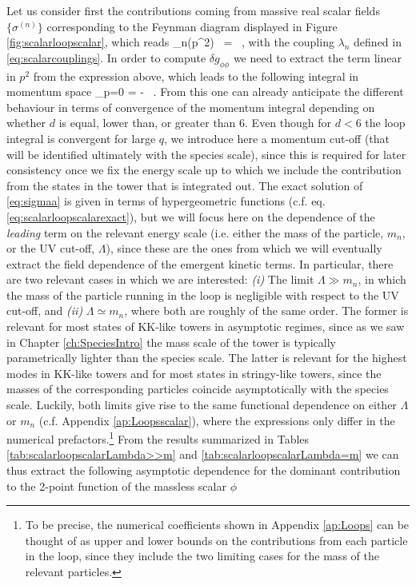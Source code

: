 Let us consider first the contributions coming from massive real scalar fields $\{\sigma^{(n)}\}$ corresponding to the Feynman diagram displayed in Figure \ref{fig:scalarloopscalar}, which reads
%
\beq
	\Pi_n(p^2) \ =  \int {}  \, ,
	\label{eq:selfenergyscalar}
\eeq
%
with the coupling $\lambda_n$ defined in \eqref{eq:scalarcouplings}. In order to compute $\delta g_{\phi \phi}$ we need to extract the term linear in $p^2$ from the expression above, which leads to the following integral in momentum space
%
\beq
	 \bigg\rvert_{p=0}  = -  \int {} \, .
	\label{eq:sigmaa}
\eeq
%
From this one can already anticipate the different behaviour in terms of convergence of the momentum integral depending on whether $d$ is equal, lower than, or greater than 6. Even though for $d<6$ the loop integral is convergent for large $q$, we introduce here a momentum cut-off (that will be identified ultimately with the species scale), since this is required for later consistency once we fix the energy scale up to which we include the contribution from the states in the tower that is integrated out. The exact solution of \eqref{eq:sigmaa} is given in terms of hypergeometric functions (c.f. eq. \eqref{eq:scalarloopscalarexact}), but we will focus here on the dependence of the \emph{leading} term on the relevant energy scale (i.e. either the mass of the particle, $m_n$, or the UV cut-off, $\Lambda$), since these are the ones from which we will eventually extract the field dependence of the emergent kinetic terms. In particular, there are two relevant cases in which we are interested: \emph{(i)} The limit $\Lambda \gg m_n$, in which the mass of the particle running in the loop is negligible with respect to the UV cut-off, and \emph{(ii)} $\Lambda\simeq m_n$, where both are roughly of the same order. The former is relevant for most states of KK-like towers in asymptotic regimes, since as we saw in Chapter \ref{ch:SpeciesIntro} the mass scale of the tower is typically parametrically lighter than the species scale. The latter is relevant for the highest modes in KK-like towers and for most states in stringy-like towers, since the masses of the corresponding particles coincide asymptotically with the species scale. Luckily, both limits give rise to the same functional dependence on either $\Lambda$ or $m_n$ (c.f. Appendix \ref{ap:Loopsscalar}), where the expressions only differ in the numerical prefactors.\footnote{To be precise, the numerical coefficients shown in Appendix \ref{ap:Loops} can be thought of as upper and lower bounds on the contributions from each particle in the loop, since they include the two limiting cases for the mass of the relevant particles.} From the results summarized in Tables \ref{tab:scalarloopscalarLambda>>m} and \ref{tab:scalarloopscalarLambda=m} we can thus extract the following asymptotic dependence for the dominant contribution to the 2-point function of the massless scalar $\phi$
